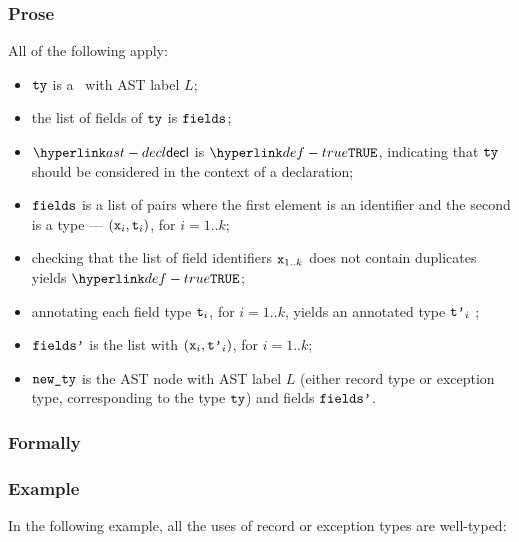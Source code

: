 \subsubsection{Prose}
All of the following apply:
\begin{itemize}
  \item $\tty$ is a \structuredtype\ with AST label $L$;
  \item the list of fields of $\tty$ is $\fields$;
  \item $\decl$ is $\True$, indicating that $\tty$ should be considered in the context of a declaration;
  \item $\fields$ is a list of pairs where the first element is an identifier and the second is a type --- $(\vx_i, \vt_i)$, for $i=1..k$;
  \item checking that the list of field identifiers $\vx_{1..k}$ does not contain duplicates
  yields $\True$\ProseOrTypeError;
  \item annotating each field type $\vt_i$, for $i=1..k$, yields an annotated type $\vtp_i$
 \ProseOrTypeError;
  \item $\fieldsp$ is the list with $(\vx_i, \vtp_i)$, for $i=1..k$;
  \item $\newty$ is the AST node with AST label $L$ (either record type or exception type,
  corresponding to the type $\tty$) and fields $\fieldsp$.
\end{itemize}

\subsubsection{Formally}
\begin{mathpar}
\end{mathpar}

\subsubsection{Example}
In the following example, all the uses of record or exception types are well-typed:


